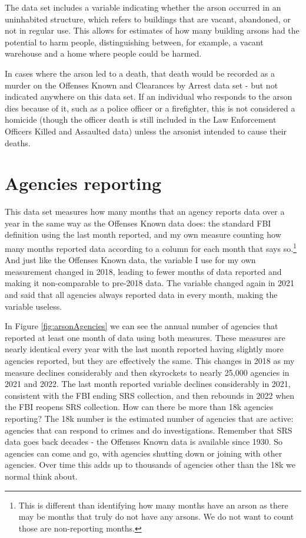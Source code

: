 \documentclass[
]{krantz}
\begin{document}
The data set includes a variable indicating whether the arson
occurred in an uninhabited structure, which refers to
buildings that are vacant, abandoned, or not in regular use.
This allows for estimates of how many building arsons had
the potential to harm people, distinguishing between, for
example, a vacant warehouse and a home where people could be
harmed.

In cases where the arson led to a death, that death would be
recorded as a murder on the Offenses Known and Clearances by
Arrest data set - but not indicated anywhere on this data set.
If an individual who responds to the arson dies because of
it, such as a police officer or a firefighter, this is not
considered a homicide (though the officer death is still
included in the Law Enforcement Officers Killed and
Assaulted data) unless the arsonist intended to cause their
deaths.

\section{Agencies reporting}\label{agencies-reporting-4}

This data set measures how many months that an agency reports
data over a year in the same way as the Offenses Known data
does: the standard FBI definition using the last month
reported, and my own measure counting how many months
reported data according to a column for each month that says
so.\footnote{This is different than identifying how many
  months have an arson as there may be months that truly do
  not have any arsons. We do not want to count those are
  non-reporting months.} And just like the Offenses Known
data, the variable I use for my own measurement changed in
2018, leading to fewer months of data reported and making it
non-comparable to pre-2018 data. The variable changed again
in 2021 and said that all agencies always reported data in
every month, making the variable useless.

In Figure \ref{fig:arsonAgencies} we can see the annual
number of agencies that reported at least one month of data
using both measures. These measures are nearly identical
every year with the last month reported having slightly more
agencies reported, but they are effectively the same. This
changes in 2018 as my measure declines considerably and then
skyrockets to nearly 25,000 agencies in 2021 and 2022. The
last month reported variable declines considerably in 2021,
consistent with the FBI ending SRS collection, and then
rebounds in 2022 when the FBI reopens SRS collection. How
can there be more than 18k agencies reporting? The 18k
number is the estimated number of agencies that are active:
agencies that can respond to crimes and do investigations.
Remember that SRS data goes back decades - the Offenses
Known data is available since 1930. So agencies can come and
go, with agencies shutting down or joining with other
agencies. Over time this adds up to thousands of agencies
other than the 18k we normal think about.
\end{document}
